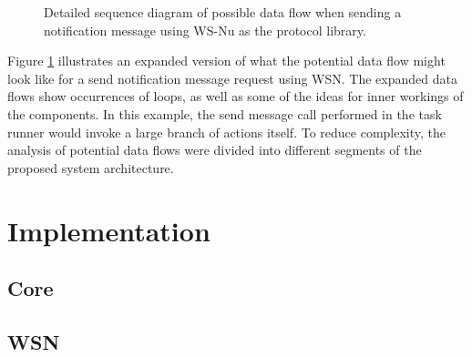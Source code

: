 \begin{center}
  \begin{figure}[ht!]
    \caption{Detailed sequence diagram of possible data flow when sending a notification message using WS-Nu as the protocol library.}
    \label{fig:architecture_data_flow}
  \end{figure}
\end{center}
Figure \ref{fig:architecture_data_flow} illustrates an expanded version of what the potential data flow might look like for a send notification message request using WSN. The expanded data flows show occurrences of loops, as well as some of the ideas for inner workings of the components. In this example, the send message call performed in the task runner would invoke a large branch of actions itself. To reduce complexity, the analysis of potential data flows were divided into different segments of the proposed system architecture.


\section{Implementation}
\label{sec:architecture_and_implementation-implementation}

\subsection{Core}
\label{subsec:architecture_and_implementation-implementation-core}

\subsection{WSN}
\label{subsec:architecture_and_implementation-implementation-wsn}

